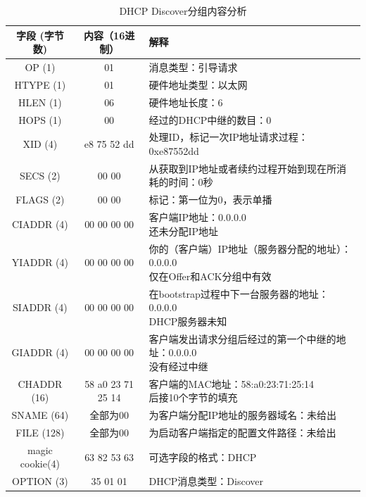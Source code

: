 \documentclass[lang=cn,11pt,a4paper,cite=authornum]{paper}
\begin{document}
\begin{table}[!htbp]
    \centering
    \caption{DHCP Discover分组内容分析\label{tab:dhcp1res}}
    \begin{tabular}{|c|c|l|}
        \hline
        字段 (字节数) & 内容（16进制） & 解释 \\
        \hline
        OP (1) & 01 & 消息类型：引导请求 \\
        \hline
        HTYPE (1) & 01 & 硬件地址类型：以太网 \\
        \hline
        HLEN (1) & 06 & 硬件地址长度：6 \\
        \hline
        HOPS (1) & 00 & 经过的DHCP中继的数目：0 \\
        \hline
        XID (4) & e8 75 52 dd & 处理ID，标记一次IP地址请求过程：0xe87552dd \\
        \hline
        SECS (2) & 00 00 & 从获取到IP地址或者续约过程开始到现在所消耗的时间：0秒 \\
        \hline
        FLAGS (2) & 00 00 & 标记：第一位为0，表示单播 \\
        \hline
        CIADDR (4) & 00 00 00 00 & \makecell[l]{客户端IP地址：0.0.0.0 \\ 还未分配IP地址} \\
        \hline
        YIADDR (4) & 00 00 00 00 & \makecell[l]{你的（客户端）IP地址（服务器分配的地址）：0.0.0.0 \\ 仅在Offer和ACK分组中有效} \\
        \hline
        SIADDR (4) & 00 00 00 00 & \makecell[l]{在bootstrap过程中下一台服务器的地址：0.0.0.0 \\ DHCP服务器未知} \\
        \hline
        GIADDR (4) & 00 00 00 00 & \makecell[l]{客户端发出请求分组后经过的第一个中继的地址：0.0.0.0 \\ 没有经过中继} \\
        \hline
        CHADDR (16) & 58 a0 23 71 25 14 & \makecell[l]{客户端的MAC地址：58:a0:23:71:25:14 \\ 后接10个字节的填充} \\
        \hline
        SNAME (64) & 全部为00 & 为客户端分配IP地址的服务器域名：未给出 \\
        \hline
        FILE (128) & 全部为00 & 为启动客户端指定的配置文件路径：未给出 \\
        \hline
        \makecell[c]{magic \\ cookie(4)} & 63 82 53 63 & 可选字段的格式：DHCP \\
        \hline
        OPTION (3) & 35 01 01 & DHCP消息类型：Discover \\

\end{tabular}
\end{table}
\end{document}
